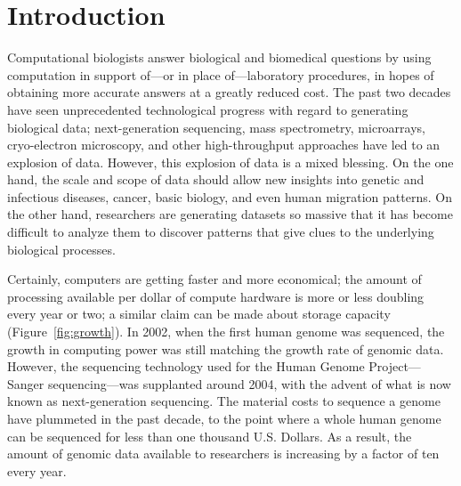 \documentclass{acm_proc_article-sp}
\begin{document}





\section{Introduction}

Computational biologists answer biological and biomedical 
questions by using computation in support of---or in place of---laboratory 
procedures, in hopes of obtaining more accurate answers at a greatly reduced 
cost.
The past two decades have seen unprecedented technological progress with regard
to generating biological data; next-generation sequencing, mass spectrometry,
microarrays, cryo-electron microscopy, and other high-throughput 
approaches have led to an explosion of data.
However, this explosion of data is a mixed blessing.
On the one hand, the scale and scope of data should allow new insights into
genetic and infectious diseases, cancer, basic biology, and even human migration
patterns.
On the other hand, researchers are generating datasets so massive that it has 
become difficult to analyze them to discover patterns that give clues to the 
underlying biological processes.

Certainly, computers are getting faster and more economical; the amount of 
processing available per dollar of compute hardware is more or less doubling 
every year or two; a similar claim can be made about storage capacity 
(Figure~\ref{fig:growth}).
In 2002, when the first human genome was sequenced, the growth in computing 
power was still matching the growth rate of genomic data.
However, the sequencing technology used for the Human Genome Project---Sanger
sequencing---was supplanted around 2004, with the advent of what is now known 
as next-generation sequencing.
The material costs to sequence a genome have plummeted in the past
decade, to the point where a whole human genome can be sequenced for less than
one thousand U.S. Dollars.
As a result, the amount of genomic data available to 
researchers is increasing by a factor of ten every year.
\end{document}
